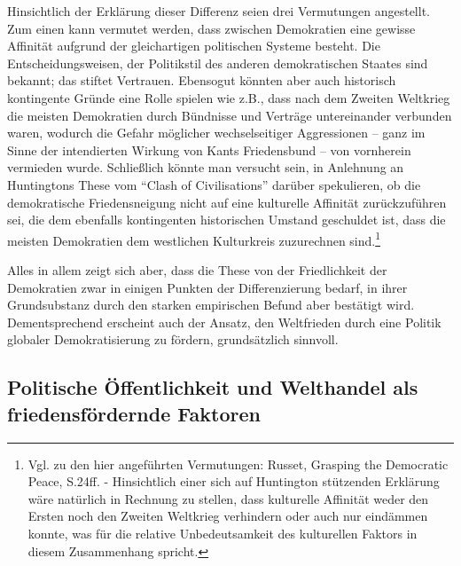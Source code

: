\documentclass[12pt,a4paper,ngerman]{article}
\begin{document}
Hinsichtlich der Erklärung dieser Differenz seien drei Vermutungen
angestellt. Zum einen kann vermutet werden, dass
zwischen Demokratien eine gewisse Affinität aufgrund der gleichartigen
politischen Systeme besteht. Die Entscheidungsweisen, der Politikstil
des anderen demokratischen Staates sind bekannt; das stiftet
Vertrauen. Ebensogut könnten aber auch historisch kontingente Gründe
eine Rolle spielen wie z.B., dass nach dem Zweiten Weltkrieg die
meisten Demokratien durch Bündnisse und Verträge untereinander
verbunden waren, wodurch die Gefahr möglicher wechselseitiger
Aggressionen -- ganz im Sinne der intendierten Wirkung von Kants
Friedensbund -- von vornherein vermieden wurde. Schließlich könnte man
versucht sein, in Anlehnung an Huntingtons These vom "`Clash of
Civilisations"' darüber spekulieren, ob die demokratische
Friedensneigung nicht auf eine kulturelle Affinität zurückzuführen
sei, die dem ebenfalls kontingenten historischen Umstand geschuldet
ist, dass die meisten Demokratien dem westlichen Kulturkreis
zuzurechnen sind.\footnote{Vgl. zu den hier angeführten Vermutungen:
    Russet, Grasping the Democratic Peace, S.24ff. - Hinsichtlich
    einer sich auf Huntington stützenden Erklärung wäre natürlich in
    Rechnung zu stellen, dass kulturelle Affinität weder den Ersten
    noch den Zweiten Weltkrieg verhindern oder auch nur eindämmen
    konnte, was für die relative Unbedeutsamkeit des kulturellen
    Faktors in diesem Zusammenhang spricht.}

Alles in allem zeigt sich aber, dass die These von der Friedlichkeit
der Demokratien zwar in einigen Punkten der Differenzierung bedarf, in
ihrer Grundsubstanz durch den starken empirischen Befund aber
bestätigt wird. Dementsprechend erscheint auch der Ansatz, den
Weltfrieden durch eine Politik globaler Demokratisierung zu fördern,
grundsätzlich sinnvoll.

\subsection{Politische Öffentlichkeit und Welthandel als friedensfördernde Faktoren}
\end{document}

